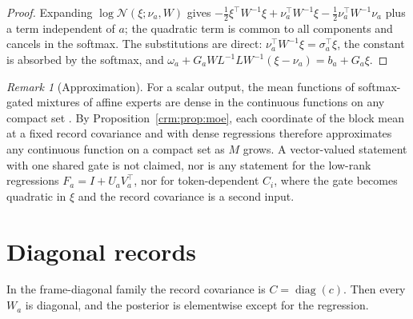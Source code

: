 \documentclass[11pt]{article}
\theoremstyle{definition}
\theoremstyle{remark}
\newtheorem{remark}[theorem]{Remark}
\newcommand{\Gauss}{\mathcal N}
\newcommand{\diag}{\operatorname{diag}}
\begin{document}
\begin{proof}
Expanding $\log\Gauss(\xi;\nu_a,W)$ gives $-\tfrac12\xi^\top W^{-1}\xi+\nu_a^\top W^{-1}\xi-\tfrac12\nu_a^\top W^{-1}\nu_a$ plus a term independent of $a$; the quadratic term is common to all components and cancels in the softmax. The substitutions are direct: $\nu_a^\top W^{-1}\xi=\sigma_a^\top\xi$, the constant is absorbed by the softmax, and $\omega_a+G_aWL^{-1}LW^{-1}(\xi-\nu_a)=b_a+G_a\xi$.
\end{proof}

\begin{remark}[Approximation]
\label{crm:rem:approx}
For a scalar output, the mean functions of softmax-gated mixtures of affine experts are dense in the continuous functions on any compact set \citep{Nguyen2016MoEUniversal}. By Proposition~\ref{crm:prop:moe}, each coordinate of the block mean at a fixed record covariance and with dense regressions therefore approximates any continuous function on a compact set as $M$ grows. A vector-valued statement with one shared gate is not claimed, nor is any statement for the low-rank regressions $F_a=I+U_aV_a^\top$, nor for token-dependent $C_i$, where the gate becomes quadratic in $\xi$ and the record covariance is a second input.
\end{remark}

\section{Diagonal records}
\label{crm:sec:diagonal}

In the frame-diagonal family the record covariance is $C=\diag(c)$. Then every $W_a$ is diagonal, and the posterior is elementwise except for the regression.
\end{document}
